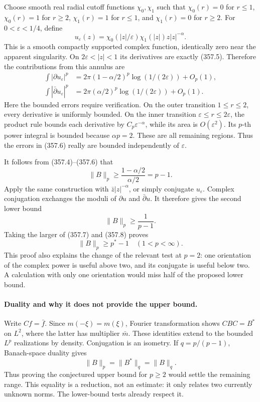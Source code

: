\documentclass[11pt]{article}
\begin{document}
Choose smooth real radial cutoff functions $\chi_0,\chi_1$ such that
$\chi_0(r)=0$ for $r\leq1$, $\chi_0(r)=1$ for $r\geq2$,
$\chi_1(r)=1$ for $r\leq1$, and $\chi_1(r)=0$ for $r\geq2$.
For $0<\varepsilon<1/4$, define
\[
 u_\varepsilon(z)=\chi_0(|z|/\varepsilon)\chi_1(|z|)
                         z|z|^{-\alpha}.
\]
This is a smooth compactly supported complex function, identically zero
near the apparent singularity. On $2\varepsilon<|z|<1$ its derivatives
are exactly (357.5). Therefore the contributions from this annulus are
\[
 \begin{split}
 \int|\partial u_\varepsilon|^p
   &=2\pi(1-\alpha/2)^p\log(1/(2\varepsilon))+O_p(1),\\
 \int|\bar\partial u_\varepsilon|^p
   &=2\pi(\alpha/2)^p\log(1/(2\varepsilon))+O_p(1).
 \end{split}
 \tag{357.6}
\]
Here the bounded errors require verification. On the outer transition
$1\leq r\leq2$, every derivative is uniformly bounded. On the inner
transition $\varepsilon\leq r\leq2\varepsilon$, the product rule
bounds each derivative by $C_p\varepsilon^{-\alpha}$, while its area
is $O(\varepsilon^2)$. Its $p$-th power integral is bounded because
$\alpha p=2$. These are all remaining regions. Thus the errors in
(357.6) really are bounded independently of $\varepsilon$.

It follows from (357.4)--(357.6) that
\[
 \|B\|_p\geq\frac{1-\alpha/2}{\alpha/2}=p-1.
 \tag{357.7}
\]
Apply the same construction with $\bar z|z|^{-\alpha}$, or simply
conjugate $u_\varepsilon$. Complex conjugation exchanges the moduli
of $\partial u$ and $\bar\partial u$. It therefore gives the second
lower bound
\[
 \|B\|_p\geq\frac1{p-1}.
 \tag{357.8}
\]
Taking the larger of (357.7) and (357.8) proves
\[
 \boxed{\ \|B\|_p\geq p^*-1\quad(1<p<\infty).\ }
 \tag{357.9}
\]
This proof also explains the change of the relevant test at $p=2$:
one orientation of the complex power is useful above two, and its
conjugate is useful below two. A calculation with only one orientation
would miss half of the proposed lower bound.

\paragraph{Duality and why it does not provide the upper bound.}
Write $Cf=\bar f$. Since $m(-\xi)=m(\xi)$, Fourier transformation
shows $CBC=B^*$ on $L^2$, where the latter has multiplier $\bar m$.
These identities extend to the bounded $L^p$ realizations by density.
Conjugation is an isometry. If $q=p/(p-1)$, Banach-space duality gives
\[
 \|B\|_p=\|B^*\|_q=\|B\|_q.
 \tag{357.10}
\]
Thus proving the conjectured upper bound for $p\geq2$ would settle
the remaining range. This equality is a reduction, not an estimate:
it only relates two currently unknown norms. The lower-bound tests
already respect it.
\end{document}
